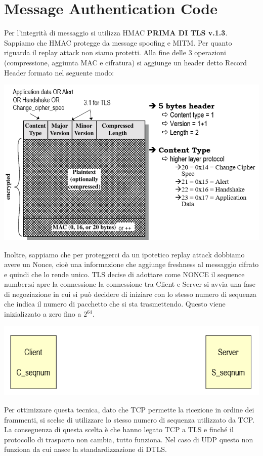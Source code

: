 \documentclass{book}
\theoremstyle{remark}
\begin{document}
\chapter{Message Authentication Code}
Per l'integrità di messaggio si utilizza HMAC \textbf{PRIMA DI TLS v\@.1\@.3}\@. Sappiamo che HMAC protegge da message spoofing e MITM\@. Per quanto riguarda il replay attack non siamo protetti\@. Alla fine delle 3 operazioni (compressione, aggiunta MAC e cifratura) si aggiunge un header detto Record Header formato nel seguente modo:
\begin{center}
	\includegraphics[scale=0.5]{TLS_Header.png}
\end{center}
Inoltre, sappiamo che per proteggerci da un ipotetico replay attack dobbiamo avere un Nonce, cioè una informazione che aggiunge freshness al messaggio cifrato e quindi che lo rende unico\@. TLS decise di adottare come NONCE il sequence number:\@quando si apre la connessione la connessione tra Client e Server si avvia una fase di negoziazione in cui si può decidere di iniziare con lo stesso numero di sequenza che indica il numero di pacchetto che si sta trasmettendo\@. Questo viene inizializzato a zero fino a \(2^{64}\)\@.\newline
\begin{center}
	\includegraphics[scale=0.5]{SequenceTLS.png}
\end{center}
Per ottimizzare questa tecnica, dato che TCP permette la ricezione in ordine dei frammenti, si scelse di utilizzare lo stesso numero di sequenza utilizzato da TCP\@. La conseguenza di questa scelta è che hanno legato TCP a TLS e finché il protocollo di trasporto non cambia, tutto funziona\@. Nel caso di UDP questo non funziona da cui nasce la standardizzazione di DTLS\@.
\end{document}
